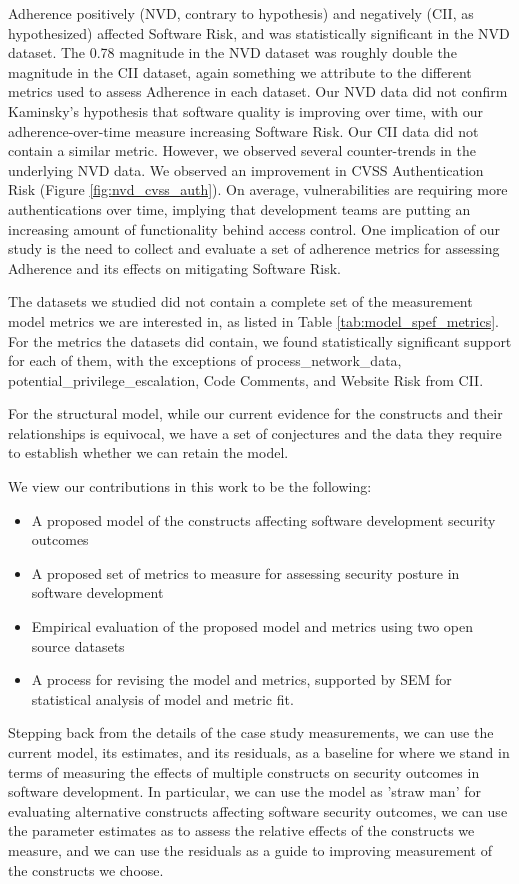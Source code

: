 Adherence positively (NVD, contrary to hypothesis) and negatively (CII, as hypothesized) affected Software Risk, and was statistically significant in the NVD dataset. The 0.78 magnitude in the NVD dataset was roughly double the magnitude in the CII dataset, again something we attribute to the different metrics used to assess Adherence in each dataset. Our NVD data did not confirm Kaminsky's hypothesis that software quality is improving over time, with our adherence-over-time measure increasing Software Risk. Our CII data did not contain a similar metric. However, we observed several counter-trends in the underlying NVD data. We observed an improvement in CVSS Authentication Risk (Figure \ref{fig:nvd_cvss_auth}). On average, vulnerabilities are requiring more authentications over time, implying that development teams are putting an increasing amount of functionality behind access control. One implication of our study is the  need to collect and evaluate a set of adherence metrics for assessing Adherence and its effects on mitigating Software Risk.

The datasets we studied did not contain a complete set of the measurement model metrics we are interested in, as listed in Table \ref{tab:model_spef_metrics}. For the metrics the datasets did contain, we found statistically significant support for each of them, with the exceptions of process\_network\_data, potential\_privilege\_escalation, Code Comments, and Website Risk from CII. 

For the structural model, while our current evidence for the constructs and their relationships is equivocal, we have a set of conjectures and the data they require to establish whether we can retain the model. 

We view our contributions in this work to be the following:
\begin{itemize}
	\item A proposed model of the constructs affecting software development security outcomes
	\item A proposed set of metrics to measure for assessing security posture in software development
	\item Empirical evaluation of the proposed model and metrics using two open source datasets
	\item A process for revising the model and metrics, supported by SEM for statistical analysis of model and metric fit. 
\end{itemize}	

Stepping back from the details of the case study measurements, we can use the current model, its estimates, and its residuals, as a baseline for where we stand in terms of measuring the effects of multiple constructs on security outcomes in software development. In particular, we can use the model as 'straw man' for evaluating alternative constructs affecting software security outcomes, we can use the parameter estimates as to assess the relative effects of the constructs we measure, and we can use the residuals as a guide to improving measurement of the constructs we choose. 


